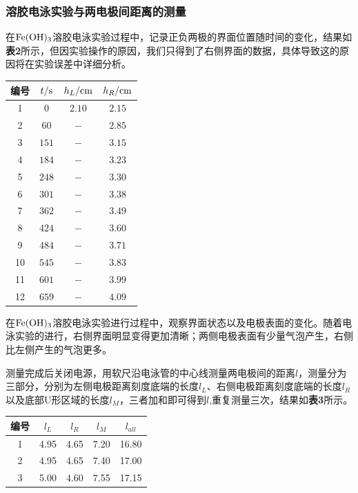 \documentclass[12pt]{article}
\begin{document}
			\subsubsection{溶胶电泳实验与两电极间距离的测量}
			在$\rm Fe(OH)_{3}$溶胶电泳实验过程中，记录正负两极的界面位置随时间的变化，结果如\textbf{表2}所示，但因实验操作的原因，我们只得到了右侧界面的数据，具体导致这的原因将在实验误差中详细分析。
			\begin{table}[h]
				\centering
				\begin{tabular}{cccc}
					\toprule
					编号 & $t/{\rm s}$ & $h_{L}/{\rm cm}$ & $h_{R}/{\rm cm}$  \\
					\midrule
					1 & $0$ & $2.10$ & $2.15$  \\
					2 & $60$ & $-$ & $2.85$  \\
					3 & $151$ & $-$ & $3.15$  \\
					4 & $184$ & $-$ & $3.23$  \\
					5 & $248$ & $-$ & $3.30$  \\
					6 & $301$ & $-$ & $3.38$  \\
					7 & $362$ & $-$ & $3.49$  \\
					8 & $424$ & $-$ & $3.60$  \\
					9 & $484$ & $-$ & $3.71$  \\
					10 &$545$ & $-$ & $3.83$  \\
					11 &$601$ & $-$ & $3.99$  \\
					12 &$659$ & $-$ & $4.09$  \\
					\bottomrule
				\end{tabular}
			\end{table}
			\par
		在$\rm Fe(OH)_{3}$溶胶电泳实验进行过程中，观察界面状态以及电极表面的变化。随着电泳实验的进行，右侧界面明显变得更加清晰；两侧电极表面有少量气泡产生，右侧比左侧产生的气泡更多。\par 
		测量完成后关闭电源，用软尺沿电泳管的中心线测量两电极间的距离$l$，测量分为三部分，分别为左侧电极距离刻度底端的长度$l_{L}$、右侧电极距离刻度底端的长度$l_{R}$以及底部U形区域的长度$l_{M}$，三者加和即可得到$l$,重复测量三次，结果如\textbf{表3}所示。
		\begin{table}[h]
			\centering
			\begin{tabular}{ccccc}
				\toprule
				编号 & $l_{L}$ & $l_{R}$ & $l_{M}$&$l_{all}$  \\
				\midrule
				 1&4.95&4.65&7.20&16.80  \\
				 2&4.95&4.65&7.40&17.00  \\
				 3&5.00&4.60&7.55&17.15  \\
				\bottomrule
			\end{tabular}
		\end{table}
\end{document}
